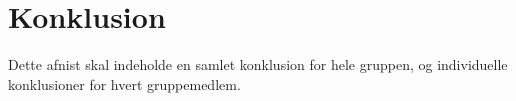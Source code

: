\chapter{Konklusion}
Dette afnist skal indeholde en samlet konklusion for hele gruppen, og individuelle konklusioner for hvert gruppemedlem.

